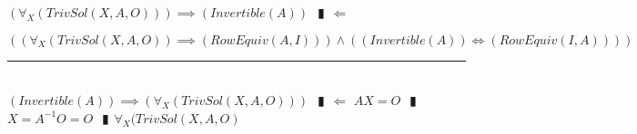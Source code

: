 \documentclass{book}
\newcommand{\pipe}{$\phantom{(}\vrectangleblack\phantom{)}$}
\newcommand{\pr}[1]{\left(#1\right)}
\begin{document}
$\pr{\forall_{X}\pr{TrivSol(X, A, O)}} \implies \pr{Invertible(A)}$ \pipe $\Leftarrow$
\begin{enumerate}
   \lit $\pr{\pr{\forall_{X}\pr{TrivSol(X, A, O)} \implies \pr{RowEquiv(A, I)}} \land \pr{\pr{Invertible(A)} \iff \pr{RowEquiv(I, A)}}}$
 \end{enumerate} \vspace{.75mm} \hrule \vspace{.75mm} \ \\ 

$\pr{Invertible(A)} \implies \pr{\forall_{X}\pr{TrivSol(X, A, O)}}$ \pipe $\Leftarrow$ $A X = O$ \pipe $X = A^{-1} O = O$ \pipe $\forall_{X}(TrivSol(X, A, O)$ \\


\end{document}
